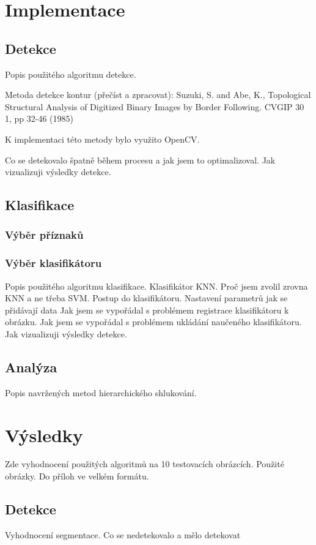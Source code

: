 \documentclass[11pt,twoside,a4paper]{book}
\begin{document}
\chapter{Implementace}

\section{Detekce}
Popis použitého algoritmu detekce.

Metoda detekce kontur (přečíst a zpracovat):
Suzuki, S. and Abe, K., Topological Structural Analysis of Digitized Binary Images by Border Following. CVGIP 30 1, pp 32-46 (1985)

K implementaci této metody bylo využito OpenCV.

Co se detekovalo špatně během procesu a jak jsem to optimalizoval.
Jak vizualizuji výsledky detekce.

\section{Klasifikace}
\subsection{Výběr příznaků}
\subsection{Výběr klasifikátoru}
Popis použitého algoritmu klasifikace. Klasifikátor KNN. 
Proč jsem zvolil zrovna KNN a ne třeba SVM. Postup do klasifikátoru.
Nastavení parametrů
jak se přidávají data
Jak jsem se vypořádal s problémem registrace klasifikátoru k obrázku.
Jak jsem se vypořádal s problémem ukládání naučeného klasifikátoru.
Jak vizualizuji výsledky detekce.

\section{Analýza}
Popis navržených metod hierarchického shlukování.

\chapter{Výsledky}
Zde vyhodnocení použitých algoritmů na 10 testovacích obrázcích.
Použité obrázky. Do příloh ve velkém formátu.

\section{Detekce}
Vyhodnocení segmentace. Co se nedetekovalo a mělo detekovat
\end{document}
